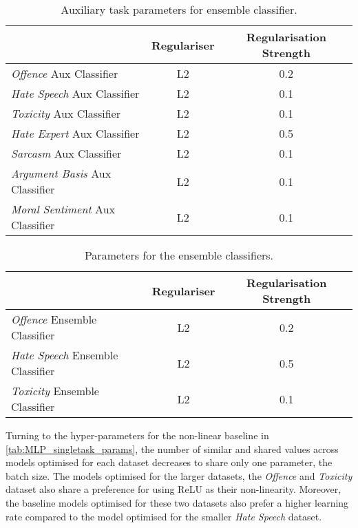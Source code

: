 \begin{table}[h]
  \centering
  \begin{tabular}{l|cc}
                                            & Regulariser & Regularisation Strength \\\hline
    \textit{Offence} Aux Classifier         & L2          & 0.2                     \\
    \textit{Hate Speech} Aux Classifier     & L2          & 0.1                     \\
    \textit{Toxicity} Aux Classifier        & L2          & 0.1                     \\
    \textit{Hate Expert} Aux Classifier     & L2          & 0.5                     \\
    \textit{Sarcasm} Aux Classifier         & L2          & 0.1                     \\
    \textit{Argument Basis} Aux Classifier  & L2          & 0.1                     \\
    \textit{Moral Sentiment} Aux Classifier & L2          & 0.1
  \end{tabular}
  \caption{Auxiliary task parameters for ensemble classifier.}
  \label{tab:ensemble_aux_params}
\end{table}

\begin{table}[h]
  \centering
  \begin{tabular}{l|cc}
                                             & Regulariser & Regularisation Strength \\\hline
    \textit{Offence} Ensemble Classifier     & L2          & 0.2                     \\
    \textit{Hate Speech} Ensemble Classifier & L2          & 0.5                     \\
    \textit{Toxicity} Ensemble Classifier    & L2          & 0.1
  \end{tabular}
  \caption{Parameters for the ensemble classifiers.}
  \label{tab:ensemble_params}
\end{table}

Turning to the hyper-parameters for the non-linear baseline in \cref{tab:MLP_singletask_params}, the number of similar and shared values across models optimised for each dataset decreases to share only one parameter, the batch size.
The models optimised for the larger datasets, the \textit{Offence} and \textit{Toxicity} dataset also share a preference for using ReLU as their non-linearity.
Moreover, the baseline models optimised for these two datasets also prefer a higher learning rate compared to the model optimised for the smaller \textit{Hate Speech} dataset.

